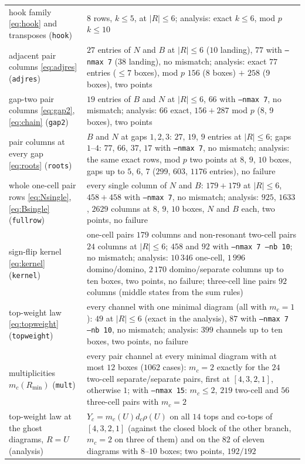 \documentclass[11pt]{article}
\newcommand{\LMPH}[1]{\texttt{#1}}
\begin{document}
\begin{longtable}{p{}p{}}
hook family \eqref{eq:hook} and transposes (\LMPH{hook}) & $8$ rows, $k\le5$, at $|R|\le6$; analysis: exact $k\le6$, mod $p$ $k\le10$\\
adjacent pair columns \eqref{eq:adjres} (\LMPH{adjres}) & $27$ entries of $N$ and $B$ at $|R|\le6$ ($10$ landing), $77$ with \LMPH{--nmax 7} ($38$ landing), no mismatch; analysis: exact $77$ entries ($\le7$ boxes), mod $p$ $156$ (8 boxes) $+$ $258$ (9 boxes), two points\\
gap-two pair columns \eqref{eq:gap2}, \eqref{eq:chain} (\LMPH{gap2}) & $19$ entries of $B$ and $N$ at $|R|\le6$, $66$ with \LMPH{--nmax 7}, no mismatch; analysis: $66$ exact, $156+287$ mod $p$ (8, 9 boxes), two points\\
pair columns at every gap \eqref{eq:roots} (\LMPH{roots}) & $B$ and $N$ at gaps $1,2,3$: $27$, $19$, $9$ entries at $|R|\le6$; gaps $1$--$4$: $77$, $66$, $37$, $17$ with \LMPH{--nmax 7}, no mismatch; analysis: the same exact rows, mod $p$ two points at $8$, $9$, $10$ boxes, gaps up to $5$, $6$, $7$ ($299$, $603$, $1176$ entries), no failure\\
whole one-cell pair rows \eqref{eq:Nsingle}, \eqref{eq:Bsingle} (\LMPH{fullrow}) & every single column of $N$ and $B$: $179+179$ at $|R|\le6$, $458+458$ with \LMPH{--nmax 7}, no mismatch; analysis: $925$, $1633$, $2629$ columns at $8$, $9$, $10$ boxes, $N$ and $B$ each, two points, no failure\\
sign-flip kernel \eqref{eq:kernel} (\LMPH{kernel}) & one-cell pairs $179$ columns and non-resonant two-cell pairs $24$ columns at $|R|\le6$; $458$ and $92$ with \LMPH{--nmax 7 --nb 10}; no mismatch; analysis: $10\,346$ one-cell, $1\,996$ domino/domino, $2\,170$ domino/separate columns up to ten boxes, two points, no failure; three-cell line pairs $92$ columns (middle states from the sum rules)\\
top-weight law \eqref{eq:topweight} (\LMPH{topweight}) & every channel with one minimal diagram (all with $m_c=1$): $49$ at $|R|\le6$ (exact in the analysis), $87$ with \LMPH{--nmax 7 --nb 10}, no mismatch; analysis: $399$ channels up to ten boxes, two points, no failure\\
multiplicities $m_c(R_{\min})$ (\LMPH{mult}) & every pair channel at every minimal diagram with at most $12$ boxes ($1062$ cases): $m_c=2$ exactly for the $24$ two-cell separate/separate pairs, first at $[4,3,2,1]$, otherwise $1$; with \LMPH{--nmax 15}: $m_c\le2$, $219$ two-cell and $56$ three-cell pairs with $m_c=2$\\
top-weight law at the ghost diagrams, $R=U$ (analysis) & $Y_c=m_c(U)d_c\rho(U)$ on all $14$ tops and co-tops of $[4,3,2,1]$ (against the closed block of the other branch, $m_c=2$ on three of them) and on the $82$ of eleven diagrams with $8$--$10$ boxes; two points, $192/192$\\

\end{longtable}
\end{document}
